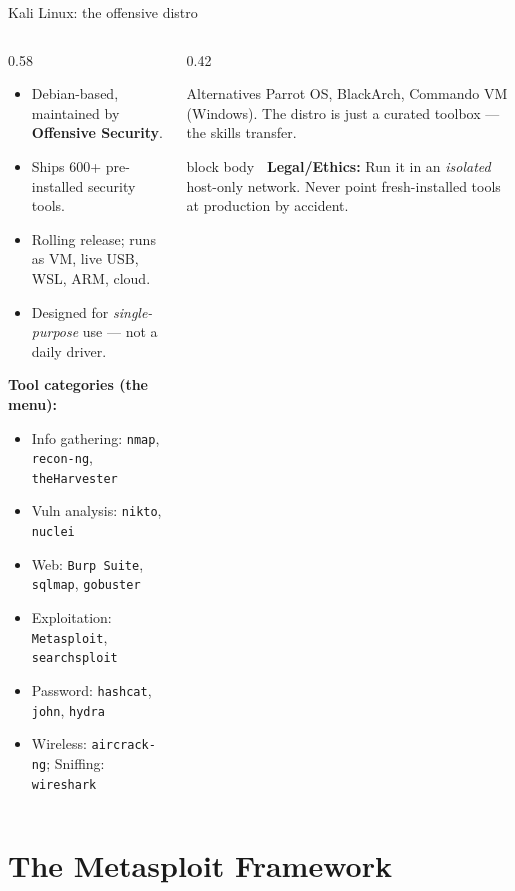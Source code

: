 \documentclass[aspectratio=169,11pt]{beamer}
\newcommand{\legalbox}[1]{%
  \begin{beamercolorbox}[wd=\textwidth,sep=6pt,rounded=true]{block body}%
  \color{warnRed}\textbf{\faExclamationTriangle\ Legal/Ethics:} #1%
  \end{beamercolorbox}}
\begin{document}
\begin{frame}{Kali Linux: the offensive distro}
  \begin{columns}[T]
    \begin{column}{0.58\textwidth}
      \begin{itemize}
        \item Debian-based, maintained by \textbf{Offensive Security}.
        \item Ships 600+ pre-installed security tools.
        \item Rolling release; runs as VM, live USB, WSL, ARM, cloud.
        \item Designed for \emph{single-purpose} use --- not a daily driver.
      \end{itemize}
      \textbf{Tool categories (the menu):}
      \begin{itemize}\footnotesize
        \item Info gathering: \texttt{nmap}, \texttt{recon-ng}, \texttt{theHarvester}
        \item Vuln analysis: \texttt{nikto}, \texttt{nuclei}
        \item Web: \texttt{Burp Suite}, \texttt{sqlmap}, \texttt{gobuster}
        \item Exploitation: \texttt{Metasploit}, \texttt{searchsploit}
        \item Password: \texttt{hashcat}, \texttt{john}, \texttt{hydra}
        \item Wireless: \texttt{aircrack-ng}; Sniffing: \texttt{wireshark}
      \end{itemize}
    \end{column}
    \begin{column}{0.42\textwidth}
      \begin{alertblock}{\footnotesize Alternatives}
        \footnotesize Parrot OS, BlackArch, Commando VM (Windows). The distro
        is just a curated toolbox --- the skills transfer.
      \end{alertblock}
      \legalbox{\footnotesize Run it in an \emph{isolated} host-only network.
      Never point fresh-installed tools at production by accident.}
    \end{column}
  \end{columns}
\end{frame}

\section{The Metasploit Framework}
\end{document}
